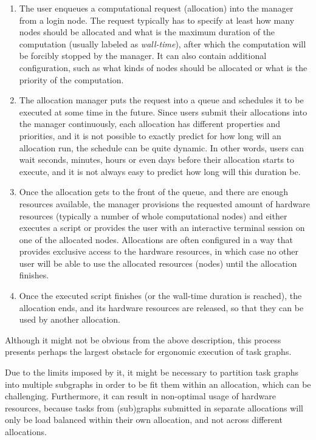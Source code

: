 \begin{enumerate}
    \item The user enqueues a computational request (allocation) into the manager from a login node. The
    request typically has to specify at least how many nodes should be allocated and what is the
    maximum duration of the computation (usually labeled as \emph{wall-time}), after which
    the computation will be forcibly stopped by the manager. It can also contain additional
    configuration, such as what kinds of nodes should be allocated or what is the priority of the
    computation.
    \item The allocation manager puts the request into a queue and schedules it to be executed at some time
    in the future. Since users submit their allocations into the manager continuously, each allocation
    has different properties and priorities, and it is not possible to exactly predict for how long
    will an allocation run, the schedule can be quite dynamic. In other words, users can wait seconds,
    minutes, hours or even days before their allocation starts to execute, and it is not always easy to
    predict how long will this duration be.
    \item Once the allocation gets to the front of the queue, and there are enough resources available, the
    manager provisions the requested amount of hardware resources (typically a number of whole
    computational nodes) and either executes a script or provides the user with an interactive terminal
    session on one of the allocated nodes. Allocations are often configured in a way that provides
    exclusive access to the hardware resources, in which case no other user will be able to use the
    allocated resources (nodes) until the allocation finishes.
    \item Once the executed script finishes (or the wall-time duration is reached), the allocation ends, and
    its hardware resources are released, so that they can be used by another allocation.
\end{enumerate}

Although it might not be obvious from the above description, this process presents perhaps the
largest obstacle for ergonomic execution of task graphs.


Due to the limits imposed by it, it might be necessary to partition task graphs into multiple
subgraphs in order to be fit them within an allocation, which can be challenging. Furthermore, it
can result in non-optimal usage of hardware resources, because tasks from (sub)graphs submitted in
separate allocations will only be load balanced within their own allocation, and not across
different allocations.


